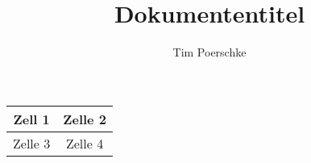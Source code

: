 

\title{Dokumententitel}
\author{Tim Poerschke}

\ihead{}
\chead{}
\ohead{}
\ifoot{}
\cfoot{\pagemark}
\ofoot{}



\setlength{\parskip}{0em}
\setlength{\parindent}{0em}
\renewcommand{\baselinestretch}{1.15}



\docheader

\renewcommand{\arraystretch}{1.5}
\begin{tabular}{|c|c|}
\hline 
Zell 1 & Zelle 2 \\ 
\hline 
Zelle 3 & Zelle 4 \\ 
\hline 
\end{tabular} 

	
